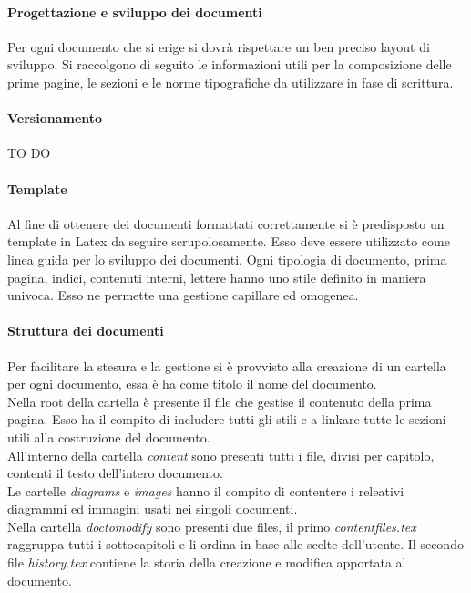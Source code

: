 			\paragraph{Progettazione e sviluppo dei documenti}
			Per ogni documento che si erige si dovrà rispettare un ben preciso layout di sviluppo. Si raccolgono di seguito le informazioni utili per la composizione delle prime pagine, le sezioni e le norme tipografiche da utilizzare in fase di scrittura.

			\paragraph{Versionamento} TO DO

			\paragraph{Template}
			Al fine di ottenere dei documenti formattati correttamente si è predisposto un template in Latex da seguire scrupolosamente. Esso deve essere utilizzato come linea guida per lo sviluppo dei documenti. Ogni tipologia di documento, prima pagina, indici, contenuti interni, lettere hanno uno stile definito in maniera univoca. Esso ne permette una gestione capillare ed omogenea.\\


			\paragraph{Struttura dei documenti}
			Per facilitare la stesura e la gestione si è provvisto alla creazione di un cartella per ogni documento, essa è ha come titolo il nome del documento.\\
			Nella root della cartella è presente il file che gestise il contenuto della prima pagina. Esso ha il compito di includere tutti gli stili e a linkare tutte le sezioni utili alla costruzione del documento.\\
			All'interno della cartella \emph{content} sono presenti tutti i file, divisi per capitolo, contenti il testo dell'intero documento.\\
			Le cartelle \emph{diagrams} e \emph{images} hanno il compito di contentere i releativi diagrammi ed immagini usati nei singoli documenti.\\
			Nella cartella \emph{doc\textunderscore to\textunderscore modify} sono presenti due files, il primo \emph{content\textunderscore files.tex} raggruppa tutti i sottocapitoli e li ordina in base alle scelte dell'utente. Il secondo file \emph{history.tex} contiene la storia della creazione e modifica apportata al documento.

